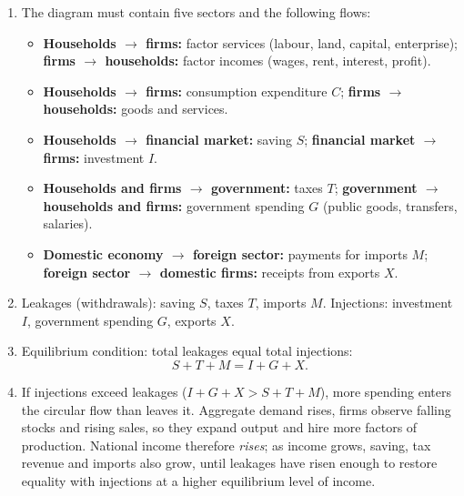 \documentclass[11pt]{article}
\begin{document}
\begin{corrige}
\begin{enumerate}
\item The diagram must contain five sectors and the following flows:
\begin{itemize}
\item \textbf{Households $\to$ firms:} factor services (labour, land, capital, enterprise); \textbf{firms $\to$ households:} factor incomes (wages, rent, interest, profit).
\item \textbf{Households $\to$ firms:} consumption expenditure $C$; \textbf{firms $\to$ households:} goods and services.
\item \textbf{Households $\to$ financial market:} saving $S$; \textbf{financial market $\to$ firms:} investment $I$.
\item \textbf{Households and firms $\to$ government:} taxes $T$; \textbf{government $\to$ households and firms:} government spending $G$ (public goods, transfers, salaries).
\item \textbf{Domestic economy $\to$ foreign sector:} payments for imports $M$; \textbf{foreign sector $\to$ domestic firms:} receipts from exports $X$.
\end{itemize}
\item Leakages (withdrawals): saving $S$, taxes $T$, imports $M$. Injections: investment $I$, government spending $G$, exports $X$.
\item Equilibrium condition: total leakages equal total injections:
\[ S + T + M = I + G + X. \]
\item If injections exceed leakages ($I + G + X > S + T + M$), more spending enters the circular flow than leaves it. Aggregate demand rises, firms observe falling stocks and rising sales, so they expand output and hire more factors of production. National income therefore \emph{rises}; as income grows, saving, tax revenue and imports also grow, until leakages have risen enough to restore equality with injections at a higher equilibrium level of income.
\end{enumerate}
\end{corrige}
\end{document}
